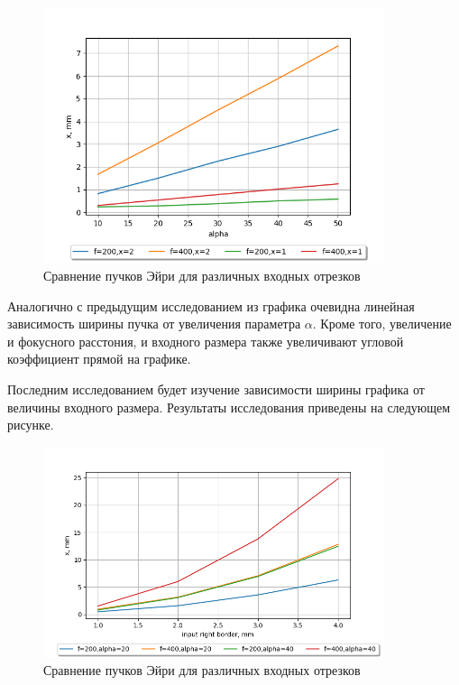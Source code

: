 {    \begin{figure}[H]
        \begin{center}
            \includegraphics[width=10cm]{plots/!graphics_alpha_no_root.png}
            \caption{Сравнение пучков Эйри для различных входных отрезков}
            \label{graphics_alpha}
        \end{center}
    \end{figure}

    Аналогично с предыдущим исследованием из графика очевидна линейная зависимость ширины пучка от увеличения параметра $\alpha$.
    Кроме того, увеличение и фокусного расстония, и входного размера также увеличивают угловой коэффициент прямой на графике.

    Последним исследованием будет изучение зависимости ширины графика от величины входного размера. Результаты исследования приведены на следующем рисунке.

    \begin{figure}[H]
        \begin{center}
            \includegraphics[width=10cm]{plots/!graphics_input.png}
            \caption{Сравнение пучков Эйри для различных входных отрезков}
            \label{graphics_input}
        \end{center}
    \end{figure}

}
